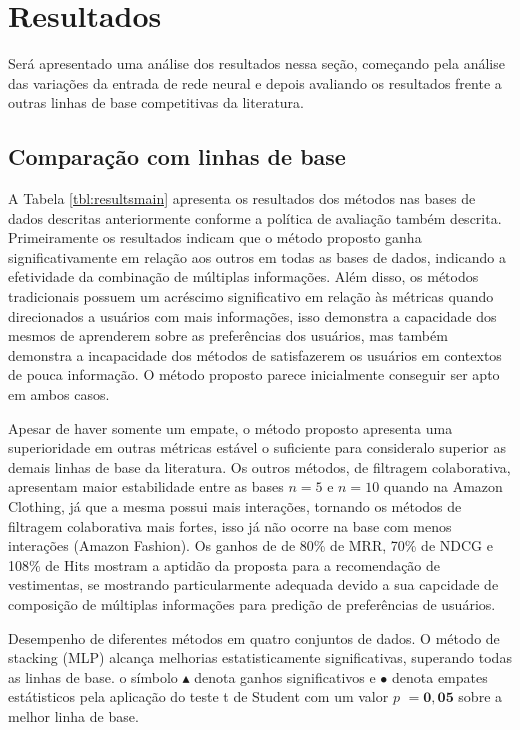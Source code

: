 \documentclass[sigconf]{acmart}
\begin{document}
\section{Resultados}

Será apresentado uma análise dos resultados nessa seção, começando pela análise das variações da entrada de rede neural e depois avaliando os resultados frente a outras linhas de base competitivas da literatura.



\subsection{Comparação com linhas de base}

A Tabela \ref{tbl:resultsmain} apresenta os resultados dos métodos nas bases de dados descritas anteriormente conforme a política de avaliação também descrita. Primeiramente os resultados indicam que o método proposto ganha significativamente em relação aos outros em todas as bases de dados, indicando a efetividade da combinação de múltiplas informações. Além disso, os métodos tradicionais possuem um acréscimo significativo em relação às métricas quando direcionados a usuários com mais informações, isso demonstra a capacidade dos mesmos de aprenderem sobre as preferências dos usuários, mas também demonstra a incapacidade dos métodos de satisfazerem os usuários em contextos de pouca informação. O método proposto parece inicialmente conseguir ser apto em ambos casos.

Apesar de haver somente um empate, o método proposto apresenta uma superioridade em outras métricas estável o suficiente para consideralo superior as demais linhas de base da literatura. Os outros métodos, de filtragem colaborativa, apresentam maior estabilidade entre as bases $n=5$ e $n=10$ quando na Amazon Clothing, já que a mesma possui mais interações, tornando os métodos de filtragem colaborativa mais fortes, isso já não ocorre na base com menos interações (Amazon Fashion). Os ganhos de de 80\% de MRR, 70\% de NDCG e 108\% de Hits mostram a aptidão da proposta para a recomendação de vestimentas, se mostrando particularmente adequada devido a sua capcidade de composição de múltiplas informações para predição de preferências de usuários.


\begin{table}
\small

\caption{\small Desempenho de diferentes métodos em quatro conjuntos de dados. O método de stacking (MLP) alcança melhorias estatisticamente significativas, superando todas as linhas de base. o símbolo \textcolor [rgb]{00,0.45,0.10}{$\blacktriangle$} denota ganhos significativos e \textcolor[rgb]{0.7,0.7,0.0}{$\bullet$} denota empates estátisticos pela aplicação do teste t de Student com um valor $p$ $\bm{=0,05}$ sobre a melhor linha de base.}
\label{tbl:resultsmain}
\end{table}
\end{document}

